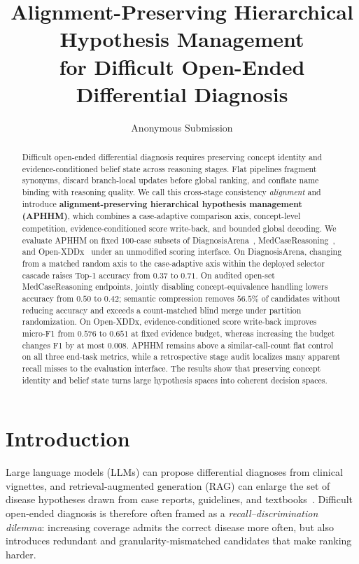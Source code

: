 \documentclass[letterpaper]{article} %
\title{%
Alignment-Preserving Hierarchical Hypothesis Management\\
for Difficult Open-Ended Differential Diagnosis%
}
\author{Anonymous Submission}
\begin{document}
\maketitle

\begin{abstract}
Difficult open-ended differential diagnosis requires preserving concept identity and evidence-conditioned belief state across reasoning stages.
Flat pipelines fragment synonyms, discard branch-local updates before global ranking, and conflate name binding with reasoning quality.
We call this cross-stage consistency \emph{alignment} and introduce \textbf{alignment-preserving hierarchical hypothesis management (APHHM)}, which combines a case-adaptive comparison axis, concept-level competition, evidence-conditioned score write-back, and bounded global decoding.
We evaluate APHHM on fixed 100-case subsets of DiagnosisArena~\cite{diagnosisarena}, MedCaseReasoning~\cite{medcasereasoning}, and Open-XDDx~\cite{dualinf2025} under an unmodified scoring interface.
On DiagnosisArena, changing from a matched random axis to the case-adaptive axis within the deployed selector cascade raises Top-1 accuracy from $0.37$ to $0.71$.
On audited open-set MedCaseReasoning endpoints, jointly disabling concept-equivalence handling lowers accuracy from $0.50$ to $0.42$; semantic compression removes $56.5\%$ of candidates without reducing accuracy and exceeds a count-matched blind merge under partition randomization.
On Open-XDDx, evidence-conditioned score write-back improves micro-F1 from $0.576$ to $0.651$ at fixed evidence budget, whereas increasing the budget changes F1 by at most $0.008$.
APHHM remains above a similar-call-count flat control on all three end-task metrics, while a retrospective stage audit localizes many apparent recall misses to the evaluation interface.
The results show that preserving concept identity and belief state turns large hypothesis spaces into coherent decision spaces.
\end{abstract}

\section{Introduction}
\label{sec:intro}

Large language models (LLMs) can propose differential diagnoses from clinical vignettes, and retrieval-augmented generation (RAG) can enlarge the set of disease hypotheses drawn from case reports, guidelines, and textbooks~\cite{lewis2020rag,wei2022cot,xiong2024medrag}.
Difficult open-ended diagnosis is therefore often framed as a \emph{recall--discrimination dilemma}: increasing coverage admits the correct disease more often, but also introduces redundant and granularity-mismatched candidates that make ranking harder.
\end{document}
